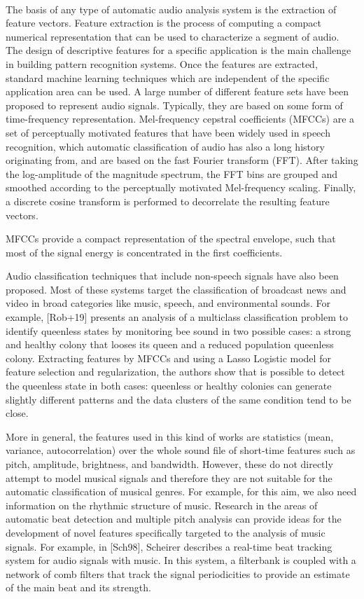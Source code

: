 \documentclass[english, LaM, oneside, noexaminfo]{sapthesis}
\begin{document}
\

The basis of any type of automatic audio analysis system is the extraction of feature vectors. Feature extraction is the process of computing a compact numerical
representation that can be used to characterize a segment of audio. The design of descriptive features for a specific application is the main challenge in building pattern recognition
systems. Once the features are extracted, standard machine learning techniques which are independent of the specific application area can be used. 
A large number of different feature sets have been proposed to represent audio signals. Typically, they are based on some form of time-frequency representation. Mel-frequency cepstral coefficients (MFCCs) are a set of perceptually motivated features that have been widely used in speech recognition, which automatic classification of audio has also a long history originating from, and are based on the fast Fourier transform (FFT). After taking the log-amplitude of the magnitude spectrum, the FFT bins are grouped and smoothed according to the perceptually motivated Mel-frequency scaling. Finally, a discrete cosine transform is performed to decorrelate the resulting feature vectors. 

MFCCs provide a compact representation of the spectral envelope, such that most of the signal energy is concentrated in the first coefficients. 

Audio classification techniques that include non-speech signals have also been proposed. Most of these systems target the classification of broadcast news and video in broad categories like music, speech, and environmental sounds. For example, [Rob+19] presents an analysis of a multiclass classification problem to identify queenless states by monitoring bee sound in two possible cases: a strong and healthy colony that looses its queen and a reduced population queenless colony. Extracting features by MFCCs and using a Lasso Logistic model for feature selection and regularization, the authors show that is possible to detect the queenless state in both cases: queenless or healthy colonies can generate slightly different patterns and the data clusters of the same condition tend to be close.

More in general, the features used in this kind of works are statistics (mean, variance, autocorrelation) over the whole sound file of short-time features such as pitch, amplitude, brightness, and bandwidth.
However, these do not directly attempt to model musical signals and therefore they are not suitable for the automatic classification of musical genres. For example, for this aim, we also need information on the rhythmic structure of music.
Research in the areas of automatic beat detection and multiple pitch analysis can provide ideas for the development of novel features specifically targeted to the analysis of music signals. For example, in [Sch98], Scheirer describes a real-time beat tracking system for audio signals with music. In this system, a filterbank is coupled with a network of comb filters that track the signal periodicities to provide an estimate of the main beat and its strength.
\end{document}
